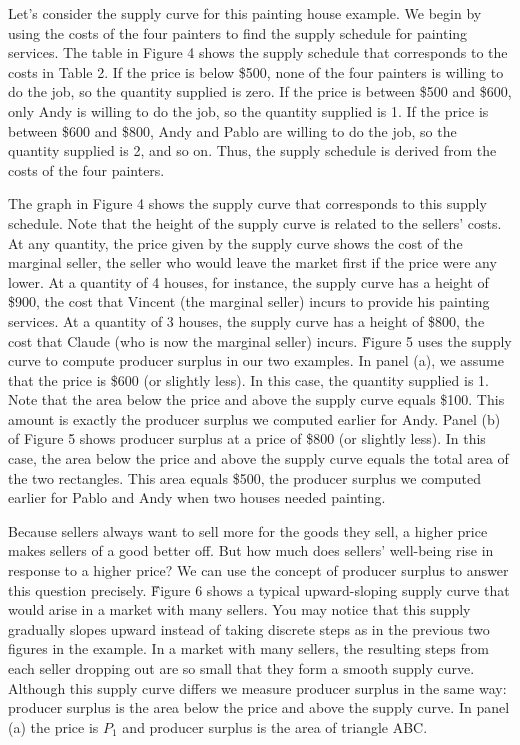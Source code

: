 Let's consider the supply curve for this painting house example. We begin by using the costs of the four painters to
find the supply schedule for painting services. The table in Figure 4 shows the supply schedule that corresponds to
the costs in Table 2. If the price is below \$500, none of the four painters is willing to do the job, so the
quantity supplied is zero. If the price is between \$500 and \$600, only Andy is willing to do the job, so the
quantity supplied is 1. If the price is between \$600 and \$800, Andy and Pablo are willing to do the job, so the
quantity supplied is 2, and so on. Thus, the supply schedule is derived from the costs of the four painters.


The graph in Figure 4 shows the supply curve that corresponds to this supply schedule. Note that the height of the
supply curve is related to the sellers' costs. At any quantity, the price given by the supply curve shows the cost of
the marginal seller, the seller who would leave the market first if the price were any lower. At a quantity of 4
houses, for instance, the supply curve has a height of \$900, the cost that Vincent (the marginal seller) incurs to
provide his painting services. At a quantity of 3 houses, the supply curve has a height of \$800, the cost that
Claude (who is now the marginal seller) incurs. \v

Figure 5 uses the supply curve to compute producer surplus in our two examples. In panel (a), we assume that the
price is \$600 (or slightly less). In this case, the quantity supplied is 1. Note that the area below the price and
above the supply curve equals \$100. This amount is exactly the producer surplus we computed earlier for Andy. Panel
(b) of Figure 5 shows producer surplus at a price of \$800 (or slightly less). In this case, the area below the price
and above the supply curve equals the total area of the two rectangles. This area equals \$500, the producer surplus
we computed earlier for Pablo and Andy when two houses needed painting.


Because sellers always want to sell more for the goods they sell, a higher price makes sellers of a good better off.
But how much does sellers' well-being rise in response to a higher price? We can use the concept of producer surplus
to answer this question precisely. \v

Figure 6 shows a typical upward-sloping supply curve that would arise in a market with many sellers. You may notice
that this supply gradually slopes upward instead of taking discrete steps as in the previous two figures in the
example. In a market with many sellers, the resulting steps from each seller dropping out are so small that they form
a smooth supply curve. Although this supply curve differs we measure producer surplus in the same way: producer
surplus is the area below the price and above the supply curve. In panel (a) the price is $P_1$ and producer surplus
is the area of triangle ABC\@.

